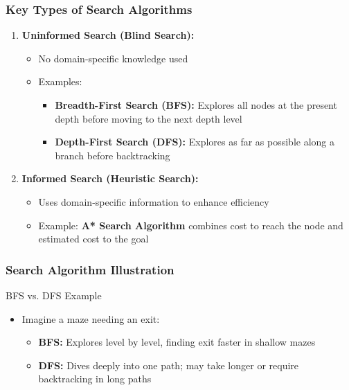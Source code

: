 \documentclass[aspectratio=169]{beamer}
\begin{document}
\begin{frame}[fragile]
    \frametitle{Key Types of Search Algorithms}
    \begin{enumerate}
        \item \textbf{Uninformed Search (Blind Search):}
            \begin{itemize}
                \item No domain-specific knowledge used
                \item Examples:
                \begin{itemize}
                    \item \textbf{Breadth-First Search (BFS):} Explores all nodes at the present depth before moving to the next depth level
                    \item \textbf{Depth-First Search (DFS):} Explores as far as possible along a branch before backtracking
                \end{itemize}
            \end{itemize}
        \item \textbf{Informed Search (Heuristic Search):}
            \begin{itemize}
                \item Uses domain-specific information to enhance efficiency
                \item Example: \textbf{A* Search Algorithm} combines cost to reach the node and estimated cost to the goal
            \end{itemize}
    \end{enumerate}
\end{frame}

\begin{frame}[fragile]
    \frametitle{Search Algorithm Illustration}
    \begin{block}{BFS vs. DFS Example}
        \begin{itemize}
            \item Imagine a maze needing an exit:
            \begin{itemize}
                \item \textbf{BFS:} Explores level by level, finding exit faster in shallow mazes
                \item \textbf{DFS:} Dives deeply into one path; may take longer or require backtracking in long paths
            \end{itemize}
        \end{itemize}
    \end{block}
\end{frame}
\end{document}
